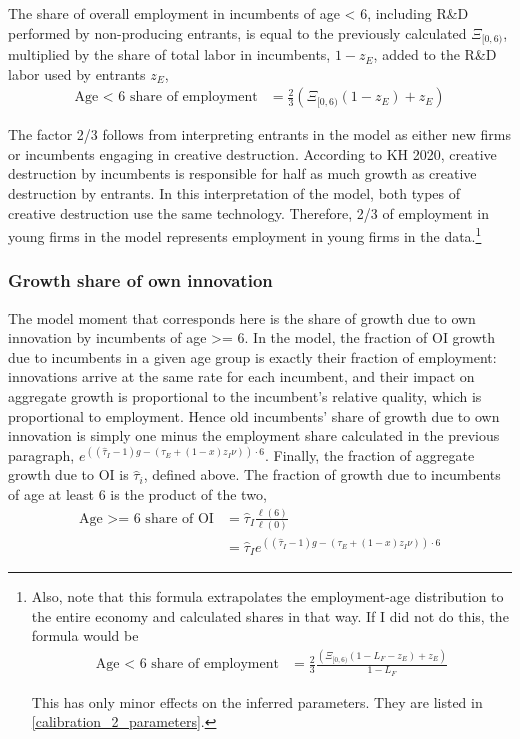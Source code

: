 \documentclass[11pt,english]{article}
\theoremstyle{remark}
\begin{document}
The share of overall employment in incumbents of age < 6, including R\&D performed by non-producing entrants, is equal to the previously calculated $\Xi_{[0,6)}$, multiplied by the share of total labor in incumbents, $1 - z_E$, added to the R\&D labor used by entrants $z_E$, 
\begin{align*}
\textrm{Age < 6 share of employment} &= \frac{2}{3}(\Xi_{[0,6)} (1-z_E) + z_E)
\end{align*}

The factor 2/3 follows from interpreting entrants in the model as either new firms or incumbents engaging in creative destruction. According to KH 2020, creative destruction by incumbents is responsible for half as much growth as creative destruction by entrants. In this interpretation of the model, both types of creative destruction use the same technology. Therefore, 2/3 of employment in young firms in the model represents employment in young firms in the data.\footnote{Also, note that this formula extrapolates the employment-age distribution to the entire economy and calculated shares in that way. If I did not do this, the formula would be
	\begin{align*}
	\textrm{Age < 6 share of employment} &= \frac{2}{3} \frac{(\Xi_{[0,6)} (1 - L_F -z_E) + z_E)}{1-L_F}
	\end{align*}
	
	This has only minor effects on the inferred parameters. They are listed in \autoref{calibration_2_parameters}.}

\subsubsection{Growth share of own innovation}

The model moment that corresponds here is the share of growth due to own innovation by incumbents of age >= 6. In the model, the fraction of OI growth due to incumbents in a given age group is exactly their fraction of employment: innovations arrive at the same rate for each incumbent, and their impact on aggregate growth is proportional to the incumbent's relative quality, which is proportional to employment. Hence old incumbents' share of growth due to own innovation is simply one minus the employment share calculated in the previous paragraph, $e^{((\hat{\tau}_I -1)g - (\tau_E + (1-x)z_I \nu))\cdot 6}$. Finally, the fraction of aggregate growth due to OI is $\hat{\tau}_i$, defined above. The fraction of growth due to incumbents of age at least 6 is the product of the two, 
\begin{align*}
\textrm{Age >= 6 share of OI} &= \hat{\tau}_I \frac{\ell(6)}{\ell(0)} \\
 &= \hat{\tau}_I e^{((\hat{\tau}_I -1)g - (\tau_E + (1-x)z_I \nu))\cdot 6} 
\end{align*}
\end{document}
